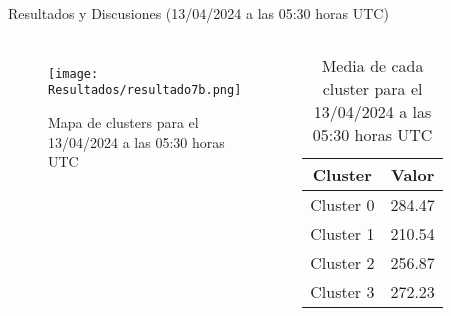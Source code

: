 \documentclass[aspectratio=169,xcolor=dvipsnames]{beamer}
\begin{document}
\begin{frame}{Resultados y Discusiones (13/04/2024 a las 05:30 horas UTC)}
    \begin{columns}

        \begin{figure}
            \centering
            \texttt{[image: Resultados/resultado7b.png]}
            {\footnotesize %
            \caption{Mapa de clusters para el 13/04/2024 a las 05:30 horas UTC}
            \label{fig23}
            }
        \end{figure}
        

        \centering
        \begin{table}[h!]
            \centering
            {\footnotesize %
            \begin{tabular}{|c|c|}
                \hline
                \textbf{Cluster} & \textbf{Valor} \\
                \hline
                Cluster 0 & 284.47 \\
                Cluster 1 & 210.54 \\
                Cluster 2 & 256.87 \\
                Cluster 3 & 272.23 \\                
                \hline
            \end{tabular}
            \caption{Media de cada cluster para el 13/04/2024 a las 05:30 horas UTC}
            }
        \end{table}

    \end{columns}
\end{frame}
\end{document}
